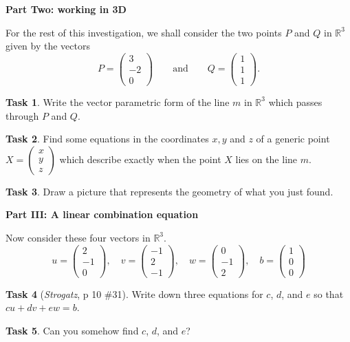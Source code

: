 \documentclass[11pt]{amsart}
\theoremstyle{definition}
\newtheorem{task}{Task}
\begin{document}
\begin{center}\textbf{Part Two: working in 3D}\end{center}

For the rest of this investigation, we shall consider the two points $P$ and $Q$ in $\mathbb{R}^3$ given by the vectors
\[
P = \begin{pmatrix} 3 \\ -2 \\ 0\end{pmatrix} \qquad \text{and} \qquad
Q = \begin{pmatrix} 1 \\ 1 \\ 1 \end{pmatrix}.
\]

\begin{task}
Write the vector parametric form of the line $m$ in $\mathbb{R}^3$ which passes through $P$ and $Q$.
\end{task}

\vspace{1.5in}

\begin{task}
Find some equations in the coordinates $x, y$ and $z$ of a generic point $X = \left( \begin{smallmatrix} x \\ y \\ z\end{smallmatrix} \right)$ which describe exactly when the point $X$ lies on the line $m$.
\end{task}

\vspace{1.5in}

\begin{task} Draw a picture that represents the geometry of what you just found.
\end{task}

\clearpage

\begin{center}\textbf{Part III: A linear combination equation}\end{center}

Now consider these four vectors in $\mathbb{R}^3$.
\[
u = \begin{pmatrix} 2 \\ -1 \\ 0 \end{pmatrix}, \quad v = \begin{pmatrix} -1\\2\\-1 \end{pmatrix}, \quad w = \begin{pmatrix}0\\-1\\2\end{pmatrix}, \quad b = \begin{pmatrix} 1\\0\\0\end{pmatrix}
\]


\begin{task}[\emph{Strogatz}, p 10 \#31]
Write down three equations for $c$, $d$, and $e$ so that $cu + dv + ew = b$.
\end{task}

\vspace{2in}

\begin{task}
Can you somehow find $c$, $d$, and $e$?
\end{task}
\end{document}
